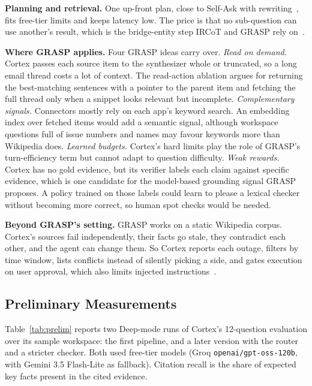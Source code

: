 \documentclass[conference]{IEEEtran}
\begin{document}
\textbf{Planning and retrieval.} One up-front plan, close to Self-Ask with rewriting~\cite{press2023selfask,ma2023rewrite}, fits free-tier limits and keeps latency low. The price is that no sub-question can use another's result, which is the bridge-entity step IRCoT and GRASP rely on~\cite{trivedi2023ircot,gandhi2026grasp}.

\textbf{Where GRASP applies.} Four GRASP ideas carry over. \emph{Read on demand.} Cortex passes each source item to the synthesizer whole or truncated, so a long email thread costs a lot of context. The read-action ablation argues for returning the best-matching sentences with a pointer to the parent item and fetching the full thread only when a snippet looks relevant but incomplete. \emph{Complementary signals.} Connectors mostly rely on each app's keyword search. An embedding index over fetched items would add a semantic signal, although workspace questions full of issue numbers and names may favour keywords more than Wikipedia does. \emph{Learned budgets.} Cortex's hard limits play the role of GRASP's turn-efficiency term but cannot adapt to question difficulty. \emph{Weak rewards.} Cortex has no gold evidence, but its verifier labels each claim against specific evidence, which is one candidate for the model-based grounding signal GRASP proposes. A policy trained on those labels could learn to please a lexical checker without becoming more correct, so human spot checks would be needed.

\textbf{Beyond GRASP's setting.} GRASP works on a static Wikipedia corpus. Cortex's sources fail independently, their facts go stale, they contradict each other, and the agent can change them. So Cortex reports each outage, filters by time window, lists conflicts instead of silently picking a side, and gates execution on user approval, which also limits injected instructions~\cite{greshake2023injection,hou2025mcp}.

\subsection{Preliminary Measurements}
Table~\ref{tab:prelim} reports two Deep-mode runs of Cortex's 12-question evaluation over its sample workspace: the first pipeline, and a later version with the router and a stricter checker. Both used free-tier models (Groq \texttt{openai/gpt-oss-120b}, with Gemini 3.5 Flash-Lite as fallback). Citation recall is the share of expected key facts present in the cited evidence.
\end{document}
